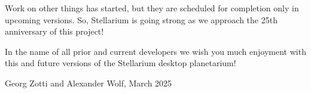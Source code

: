 Work on other things has started, but they are scheduled for completion only in upcoming versions. 
So, Stellarium is going strong as we approach the  25th anniversary of this project!


In the name of all prior and current developers we wish you much enjoyment with
this and future versions of the Stellarium desktop planetarium!

\begin{flushright}
Georg Zotti and Alexander Wolf, March 2025
\end{flushright}





